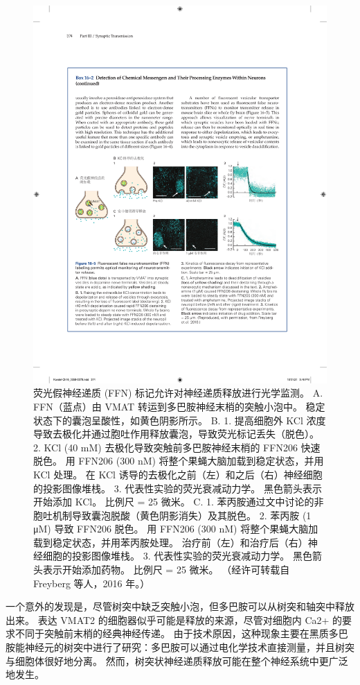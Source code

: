 \begin{figure}[htbp]
	\centering
	\includegraphics[width=0.85\linewidth]{chap16/fig_16_5}
	\caption{荧光假神经递质 (FFN) 标记允许对神经递质释放进行光学监测。 A. FFN（蓝点）由 VMAT 转运到多巴胺神经末梢的突触小泡中。 稳定状态下的囊泡呈酸性，如黄色阴影所示。 B. 1. 提高细胞外 KCl 浓度导致去极化并通过胞吐作用释放囊泡，导致荧光标记丢失（脱色）。 2. KCl (40 mM) 去极化导致突触前多巴胺神经末梢的 FFN206 快速脱色。 用 FFN206 (300 nM) 将整个果蝇大脑加载到稳定状态，并用 KCl 处理。 在 KCl 诱导的去极化之前（左）和之后（右）神经细胞的投影图像堆栈。 3. 代表性实验的荧光衰减动力学。 黑色箭头表示开始添加 KCl。 比例尺 = 25 微米。 C. 1. 苯丙胺通过文中讨论的非胞吐机制导致囊泡脱酸（黄色阴影消失）及其脱色。 2. 苯丙胺 (1 μM) 导致 FFN206 脱色。 用 FFN206 (300 nM) 将整个果蝇大脑加载到稳定状态，并用苯丙胺处理。 治疗前（左）和治疗后（右）神经细胞的投影图像堆栈。 3. 代表性实验的荧光衰减动力学。 黑色箭头表示开始添加药物。 比例尺 = 25 微米。 （经许可转载自 Freyberg 等人，2016 年。）}
	\label{fig:16_5}
\end{figure}


一个意外的发现是，尽管树突中缺乏突触小泡，但多巴胺可以从树突和轴突中释放出来。
表达 VMAT2 的细胞器似乎可能是释放的来源，尽管对细胞内 Ca2+ 的要求不同于突触前末梢的经典神经传递。
由于技术原因，这种现象主要在黑质多巴胺能神经元的树突中进行了研究：多巴胺可以通过电化学技术直接测量，并且树突与细胞体很好地分离。
然而，树突状神经递质释放可能在整个神经系统中更广泛地发生。



